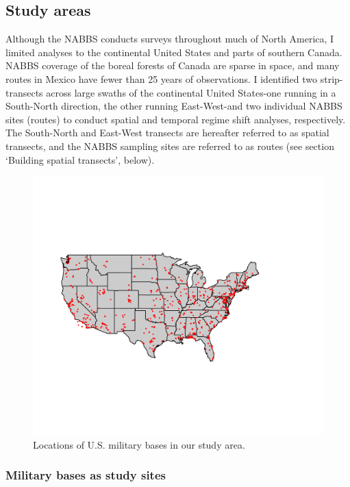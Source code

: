 \documentclass[12pt,twoside,openany]{reedthesis}
\begin{document}
\subsection{Study areas}\label{study-areas}

Although the NABBS conducts surveys throughout much of North America, I
limited analyses to the continental United States and parts of southern
Canada. NABBS coverage of the boreal forests of Canada are sparse in
space, and many routes in Mexico have fewer than 25 years of
observations. I identified two strip-transects across large swaths of
the continental United States-one running in a South-North direction,
the other running East-West-and two individual NABBS sites (routes) to
conduct spatial and temporal regime shift analyses, respectively. The
South-North and East-West transects are hereafter referred to as spatial
transects, and the NABBS sampling sites are referred to as routes (see
section `Building spatial transects', below).
\begin{figure}

{\centering \includegraphics[width=30.03in]{./chapterFiles/fisherSpatial/figures/figsCalledInDiss/milBases} 

}

\caption{Locations of U.S. military bases in our study area.}\label{fig:milBases}
\end{figure}
\subsubsection{Military bases as study
sites}\label{military-bases-as-study-sites}
\end{document}
